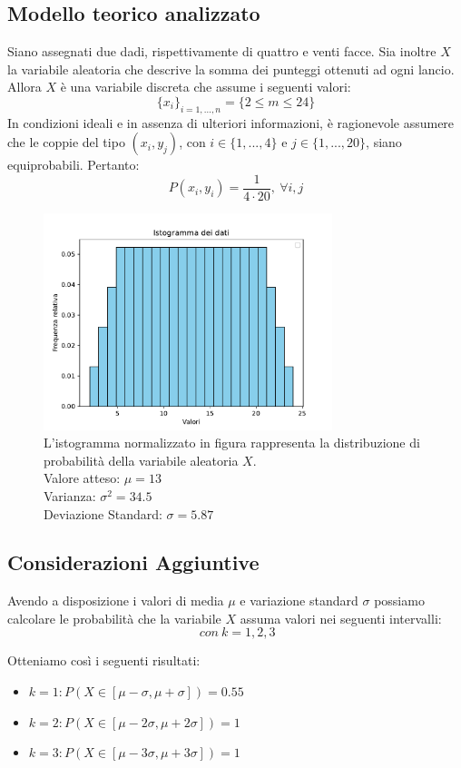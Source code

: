 \subsection{Modello teorico analizzato}
Siano assegnati due dadi, rispettivamente di quattro e venti facce. Sia inoltre $X$ la variabile aleatoria che descrive la somma dei punteggi ottenuti ad ogni lancio. Allora $X$ è una variabile discreta che assume i seguenti valori:
\begin{equation}
	\{x_i\}_{i=1,...,n} = \{2 \leq m \leq 24\}
\end{equation}
In condizioni ideali e in assenza di ulteriori informazioni, è ragionevole assumere che le coppie del tipo $(x_i, y_j)$, con $i \in \{1,...,4\}$ e $j \in \{1,...,20\}$, siano equiprobabili. Pertanto:
\begin{equation}
	P(x_i, y_i) = \frac{1}{4 \cdot 20},\ \forall i, j
\end{equation}
\begin{figure}[H]
	\centering
	\includegraphics[width=0.75\textwidth]{istogramma1.pdf}
	\caption{L'istogramma normalizzato in figura rappresenta la distribuzione di probabilità della variabile aleatoria $X$. \\
	Valore atteso: $\mu=13$ \\
	Varianza: $\sigma^2=34.5$ \\
	Deviazione Standard: $\sigma=5.87$}
\end{figure}

\subsection{Considerazioni Aggiuntive}
Avendo a disposizione i valori di media $\mu$ e variazione standard $\sigma$ possiamo calcolare le probabilità che la variabile $X$ assuma valori nei seguenti intervalli:
\begin{equation*}
	[\mu-k\sigma, \mu+k\sigma]\ con\ k=1,2,3
\end{equation*} 

Otteniamo così i seguenti risultati:
\begin{itemize}
    \item $k=1: P(X \in [\mu-\sigma, \mu+\sigma]) = 0.55$
    \item $k=2: P(X \in [\mu-2\sigma, \mu+2\sigma]) = 1$
    \item $k=3: P(X \in [\mu-3\sigma, \mu+3\sigma]) = 1$
\end{itemize}





